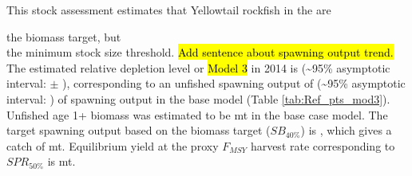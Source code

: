 \documentclass[12pt,]{article}
\begin{document}
This stock assessment estimates that Yellowtail rockfish in the are

the biomass target, but\\
the minimum stock size threshold.
\hl{Add sentence about spawning output trend.} The estimated relative
depletion level or \hl{Model 3} in 2014 is (\textasciitilde{}95\%
asymptotic interval: \(\pm\) ), corresponding to an unfished spawning
output of (\textasciitilde{}95\% asymptotic interval: ) of spawning
output in the base model (Table \ref{tab:Ref_pts_mod3}). Unfished age 1+
biomass was estimated to be mt in the base case model. The target
spawning output based on the biomass target (\(SB_{40\%}\)) is , which
gives a catch of mt. Equilibrium yield at the proxy \(F_{MSY}\) harvest
rate corresponding to \(SPR_{50\%}\) is mt.

\FloatBarrier
\end{document}
